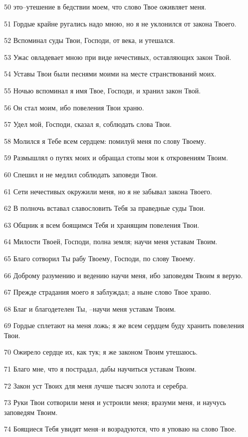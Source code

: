 \par 50 это--утешение в бедствии моем, что слово Твое оживляет меня.
\par 51 Гордые крайне ругались надо мною, но я не уклонился от закона Твоего.
\par 52 Вспоминал суды Твои, Господи, от века, и утешался.
\par 53 Ужас овладевает мною при виде нечестивых, оставляющих закон Твой.
\par 54 Уставы Твои были песнями моими на месте странствований моих.
\par 55 Ночью вспоминал я имя Твое, Господи, и хранил закон Твой.
\par 56 Он стал моим, ибо повеления Твои храню.
\par 57 Удел мой, Господи, сказал я, соблюдать слова Твои.
\par 58 Молился я Тебе всем сердцем: помилуй меня по слову Твоему.
\par 59 Размышлял о путях моих и обращал стопы мои к откровениям Твоим.
\par 60 Спешил и не медлил соблюдать заповеди Твои.
\par 61 Сети нечестивых окружили меня, но я не забывал закона Твоего.
\par 62 В полночь вставал славословить Тебя за праведные суды Твои.
\par 63 Общник я всем боящимся Тебя и хранящим повеления Твои.
\par 64 Милости Твоей, Господи, полна земля; научи меня уставам Твоим.
\par 65 Благо сотворил Ты рабу Твоему, Господи, по слову Твоему.
\par 66 Доброму разумению и ведению научи меня, ибо заповедям Твоим я верую.
\par 67 Прежде страдания моего я заблуждал; а ныне слово Твое храню.
\par 68 Благ и благодетелен Ты, --научи меня уставам Твоим.
\par 69 Гордые сплетают на меня ложь; я же всем сердцем буду хранить повеления Твои.
\par 70 Ожирело сердце их, как тук; я же законом Твоим утешаюсь.
\par 71 Благо мне, что я пострадал, дабы научиться уставам Твоим.
\par 72 Закон уст Твоих для меня лучше тысяч золота и серебра.
\par 73 Руки Твои сотворили меня и устроили меня; вразуми меня, и научусь заповедям Твоим.
\par 74 Боящиеся Тебя увидят меня--и возрадуются, что я уповаю на слово Твое.
